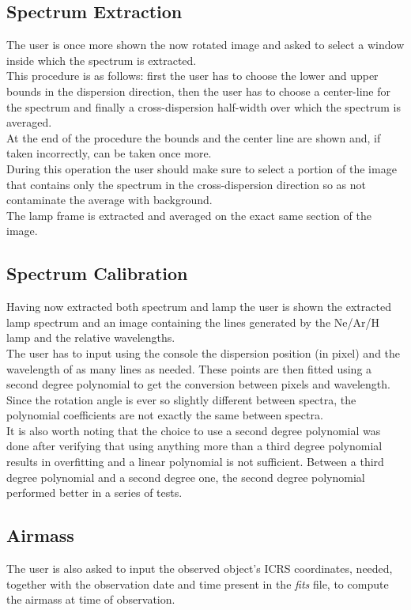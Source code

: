 \documentclass[a4paper]{article}
\begin{document}
\begin{multicols}{2}
		\subsection{Spectrum Extraction}
			The user is once more shown the now rotated image and asked to select a window inside which the spectrum is extracted.\\
			This procedure is as follows: first the user has to choose the lower and upper bounds in the dispersion direction, then the user has to choose a center-line for the spectrum and finally a cross-dispersion half-width over which the spectrum is averaged.\\
			At the end of the procedure the bounds and the center line are shown and, if taken incorrectly, can be taken once more.\\
			
			During this operation the user should make sure to select a portion of the image that contains only the spectrum in the cross-dispersion direction so as not contaminate the average with background.\\
			
			The lamp frame is extracted and averaged on the exact same section of the image.\\
			
		\subsection{Spectrum Calibration}
			Having now extracted both spectrum and lamp the user is shown the extracted lamp spectrum and an image containing the lines generated by the Ne/Ar/H lamp and the relative wavelengths.\\
			The user has to input using the console the dispersion position (in pixel) and the wavelength of as many lines as needed. These points are then fitted using a second degree polynomial to get the conversion between pixels and wavelength.\\
			Since the rotation angle is ever so slightly different between spectra, the polynomial coefficients are not exactly the same between spectra.\\
			
			It is also worth noting that the choice to use a second degree polynomial was done after verifying that using anything more than a third degree polynomial results in overfitting and a linear polynomial is not sufficient. Between a third degree polynomial and a second degree one, the second degree polynomial performed better in a series of tests.\\
		
		\subsection{Airmass}
			The user is also asked to input the observed object's ICRS coordinates, needed, together with the observation date and time present in the \textit{fits} file, to compute the airmass at time of observation.\\
		
	\end{multicols}
\end{document}

